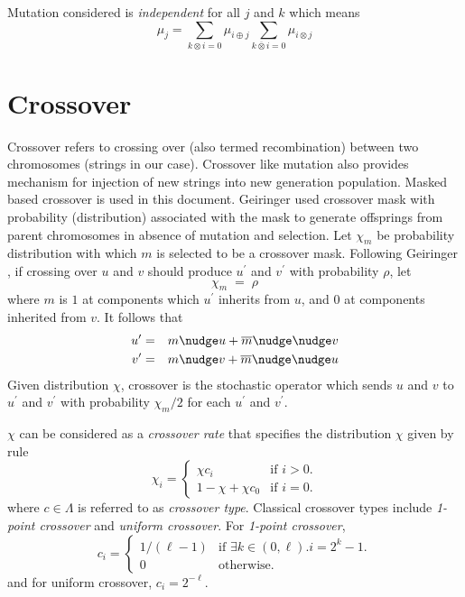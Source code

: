 Mutation considered is {\em independent} for all $j$ and $k$ which means \cite{Vose1999}
\[
\mu_j = \sum\limits_{k\otimes i=0} \mu_{i\oplus j} \sum\limits_{k\overline \otimes i=0} \mu_{i\otimes j}
\]

\section{Crossover}
Crossover refers to crossing over (also termed recombination) between two chromosomes (strings in our case). Crossover like mutation also provides mechanism for injection of new strings into new generation population. Masked based crossover is used in this document. Geiringer \cite{Geiringer1944} used crossover mask with probability (distribution) associated with the mask to generate offsprings from parent chromosomes in absence of mutation and selection. Let $\chi_m$ be probability distribution with which $m$ is selected to be a crossover mask.
Following Geiringer \cite{Geiringer1944}, if crossing over $u$ and $v$ should produce $u^\prime$ and $v^\prime$ with probability $\rho$, let
\[
\chi_m \; = \; \rho
\]
where $m$ is $1$ at components which $u^\prime$ inherits from $u$, and
$0$ at components inherited from $v$.  It follows that\\[-0.3in]
\begin{eqnarray*}
u^\prime & = & m \nudge u + \overline{m} \nudge\nudge v \\
v^\prime & = & m \nudge v + \overline{m} \nudge\nudge u
\end{eqnarray*}
Given distribution $\chi$, crossover is the stochastic operator which
sends $u$ and $v$ to $u^\prime$ and $v^\prime$ with probability $\chi_m/2$ for each $u^\prime$ and $v^\prime$.

$\chi$ can be considered as a {\em crossover rate} that specifies the distribution $\chi$ given by rule \cite{Vose1999}
\[
  \chi_i =\begin{cases}
    \chi  c_i & \text{if $i>0$}.\\
    1 - \chi + \chi  c_0 & \text{if $i = 0$}.
  \end{cases}
\]
where $c \in \Lambda$ is referred to as {\em crossover type}. Classical crossover types include {\em 1-point crossover} and {\em uniform crossover}. For {\em 1-point crossover},
\[
  c_i =\begin{cases}
    1/(\ell - 1) & \text{if $\exists k \in (0, \ell).i = 2^k - 1$}.\\
    0 & \text{otherwise}.
  \end{cases}
\]
and for uniform crossover, $c_i = 2^{-\ell}$.

